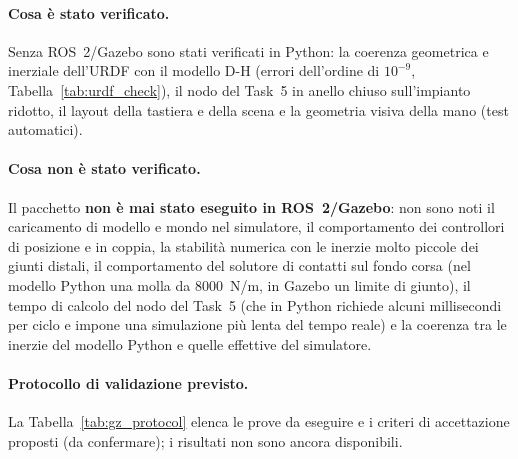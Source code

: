 \paragraph{Cosa è stato verificato.} Senza ROS~2/Gazebo sono stati verificati in Python: la coerenza geometrica e inerziale dell'URDF con il modello D-H (errori dell'ordine di $10^{-9}$, Tabella~\ref{tab:urdf_check}), il nodo del Task~5 in anello chiuso sull'impianto ridotto, il layout della tastiera e della scena e la geometria visiva della mano (test automatici).

\paragraph{Cosa non è stato verificato.} Il pacchetto \textbf{non è mai stato eseguito in ROS~2/Gazebo}: non sono noti il caricamento di modello e mondo nel simulatore, il comportamento dei controllori di posizione e in coppia, la stabilità numerica con le inerzie molto piccole dei giunti distali, il comportamento del solutore di contatti sul fondo corsa (nel modello Python una molla da $8000$~N/m, in Gazebo un limite di giunto), il tempo di calcolo del nodo del Task~5 (che in Python richiede alcuni millisecondi per ciclo e impone una simulazione più lenta del tempo reale) e la coerenza tra le inerzie del modello Python e quelle effettive del simulatore.

\paragraph{Protocollo di validazione previsto.} La Tabella~\ref{tab:gz_protocol} elenca le prove da eseguire e i criteri di accettazione proposti (da confermare); i risultati non sono ancora disponibili.

